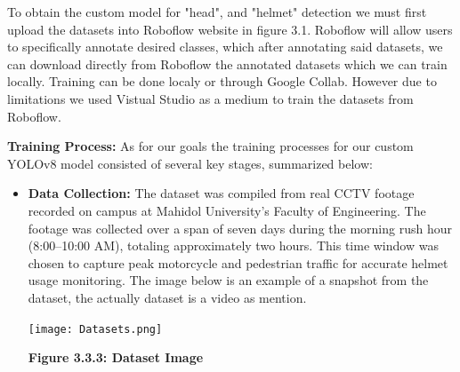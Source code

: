 To obtain the custom model for "head", and "helmet" detection we must first upload the datasets into Roboflow website in figure 3.1. Roboflow will allow users to specifically annotate desired classes, which after annotating said datasets, we can download directly from Roboflow the annotated datasets which we can train locally. Training can be done localy or through Google Collab. However due to limitations we used Vistual Studio as a medium to train the datasets from Roboflow. 

\newpage

\noindent\textbf{Training Process:} As for our goals the training processes for our custom YOLOv8 model consisted of several key stages, summarized below:

\begin{itemize}
	\item \textbf{Data Collection:} The dataset was compiled from real CCTV footage recorded on campus at Mahidol University’s Faculty of Engineering. The footage was collected over a span of seven days during the morning rush hour (8:00–10:00 AM), totaling approximately two hours. This time window was chosen to capture peak motorcycle and pedestrian traffic for accurate helmet usage monitoring.  The image below is an example of a snapshot from the dataset, the actually dataset is a video as mention.
	\begin{center}
		\texttt{[image: Datasets.png]}
		
		\vspace{0.5em}
		\textbf{Figure 3.3.3: Dataset Image}
	\end{center}
	

\end{itemize}
